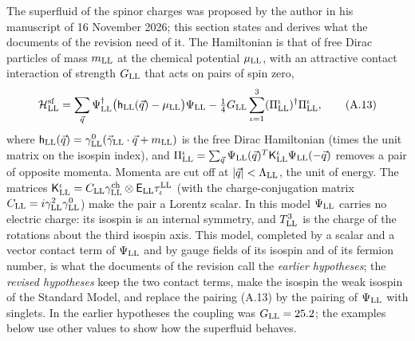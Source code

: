 \documentclass[
  10pt,
]{article}
\begin{document}
The superfluid of the spinor charges was proposed by the author in his
manuscript of 16 November 2026; this section states and derives what the
documents of the revision need of it. The Hamiltonian is that of free
Dirac particles of mass \(m_{\rm LL}\) at the chemical potential
\(\mu_{\rm LL}\), with an attractive contact interaction of strength
\(G_{\rm LL}\) that acts on pairs of spin zero,
\[\mathcal H^{\rm sf}_{\rm LL}=\sum_{\vec q}\Psi^\dagger_{\rm LL}\big(\mathsf h_{\rm LL}(\vec q)-\mu_{\rm LL}\big)\Psi_{\rm LL}-\tfrac14G_{\rm LL}\sum_{\iota=1}^3(\Pi^\iota_{\rm LL})^\dagger\Pi^\iota_{\rm LL},\tag{A.13}\]
where
\(\mathsf h_{\rm LL}(\vec q)=\gamma^0_{\rm LL}(\vec\gamma_{\rm LL}\cdot\vec q+m_{\rm LL})\)
is the free Dirac Hamiltonian (times the unit matrix on the isospin
index), and
\(\Pi^\iota_{\rm LL}=\sum_{\vec q}\Psi_{\rm LL}(\vec q)^T\mathsf K^\iota_{\rm LL}\Psi_{\rm LL}(-\vec q)\)
removes a pair of opposite momenta. Momenta are cut off at
\(|\vec q|<\Lambda_{\rm LL}\), the unit of energy. The matrices
\(\mathsf K^\iota_{\rm LL}=C_{\rm LL}\gamma^{\rm ch}_{\rm LL}\otimes\mathsf E_{\rm LL}\tau^{\rm LL}_\iota\)
(with the charge-conjugation matrix
\(C_{\rm LL}=i\gamma^2_{\rm LL}\gamma^0_{\rm LL}\)) make the pair a
Lorentz scalar. In this model \(\Psi_{\rm LL}\) carries no electric
charge: its isospin is an internal symmetry, and \(T^3_{\rm LL}\) is the
charge of the rotations about the third isospin axis. This model,
completed by a scalar and a vector contact term of \(\Psi_{\rm LL}\) and
by gauge fields of its isospin and of its fermion number, is what the
documents of the revision call the \emph{earlier hypotheses}; the
\emph{revised hypotheses} keep the two contact terms, make the isospin
the weak isospin of the Standard Model, and replace the pairing (A.13)
by the pairing of \(\Psi_{\rm LL}\) with singlets. In the earlier
hypotheses the coupling was \(G_{\rm LL}=25.2\); the examples below use
other values to show how the superfluid behaves.
\end{document}

